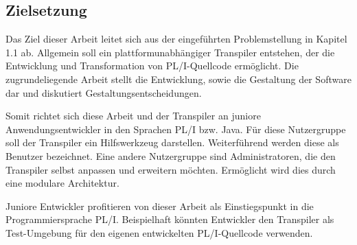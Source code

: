

% 	 
%	 
%
    
\subsection{Zielsetzung}
Das Ziel dieser Arbeit leitet sich aus der eingeführten Problemstellung in Kapitel 1.1 ab. Allgemein soll ein plattformunabhängiger Transpiler entstehen, der die  Entwicklung und Transformation von PL/I-Quellcode ermöglicht. Die zugrundeliegende Arbeit stellt die Entwicklung, sowie die Gestaltung der Software dar und diskutiert Gestaltungsentscheidungen. 

Somit richtet sich diese Arbeit und der Transpiler an juniore Anwendungsentwickler in den Sprachen PL/I bzw. Java. Für diese Nutzergruppe soll der Transpiler ein Hilfswerkzeug darstellen. Weiterführend werden diese als Benutzer bezeichnet. Eine andere Nutzergruppe sind Administratoren, die den Transpiler selbst anpassen und erweitern möchten. Ermöglicht wird dies durch eine modulare Architektur.
	
Juniore Entwickler profitieren von dieser Arbeit als Einstiegspunkt in die Programmiersprache PL/I. Beispielhaft könnten Entwickler den Transpiler als Test-Umgebung für den eigenen entwickelten PL/I-Quellcode verwenden.

